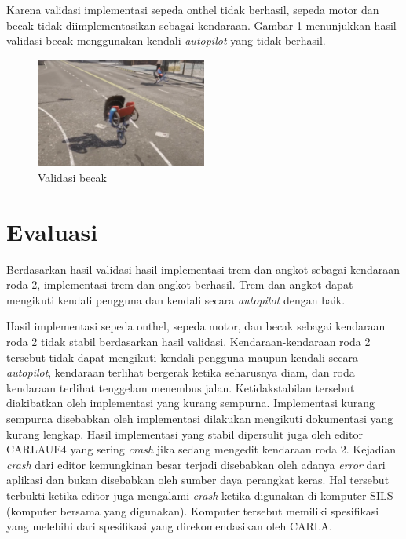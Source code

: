 Karena validasi implementasi sepeda onthel tidak berhasil, sepeda motor dan
becak tidak diimplementasikan sebagai kendaraan. Gambar
\ref{fig:becak-validation} menunjukkan hasil validasi becak menggunakan kendali
\textit{autopilot} yang tidak berhasil.

\begin{figure}[!h]
    \centering
    \includegraphics[width=0.5\textwidth]{resources/chapter-4/testing-becak-generate.png}
    \caption{Validasi becak}
    \label{fig:becak-validation}
\end{figure}

\section{Evaluasi}

Berdasarkan hasil validasi hasil implementasi trem dan angkot sebagai kendaraan
roda 2, implementasi trem dan angkot berhasil. Trem dan angkot dapat mengikuti
kendali pengguna dan kendali secara \textit{autopilot} dengan baik.

Hasil implementasi sepeda onthel, sepeda motor, dan becak sebagai kendaraan roda
2 tidak stabil berdasarkan hasil validasi. Kendaraan-kendaraan roda 2 tersebut
tidak dapat mengikuti kendali pengguna maupun kendali secara \textit{autopilot},
kendaraan terlihat bergerak ketika seharusnya diam, dan roda kendaraan terlihat
tenggelam menembus jalan. Ketidakstabilan tersebut diakibatkan oleh implementasi
yang kurang sempurna. Implementasi kurang sempurna disebabkan oleh implementasi
dilakukan mengikuti dokumentasi yang kurang lengkap. Hasil implementasi yang
stabil dipersulit juga oleh editor CARLAUE4 yang sering \textit{crash} jika
sedang mengedit kendaraan roda 2. Kejadian \textit{crash} dari editor
kemungkinan besar terjadi disebabkan oleh adanya \textit{error} dari aplikasi
dan bukan disebabkan oleh sumber daya perangkat keras. Hal tersebut terbukti
ketika editor juga mengalami \textit{crash} ketika digunakan di komputer SILS
(komputer bersama yang digunakan). Komputer tersebut memiliki spesifikasi yang
melebihi dari spesifikasi yang direkomendasikan oleh CARLA.

